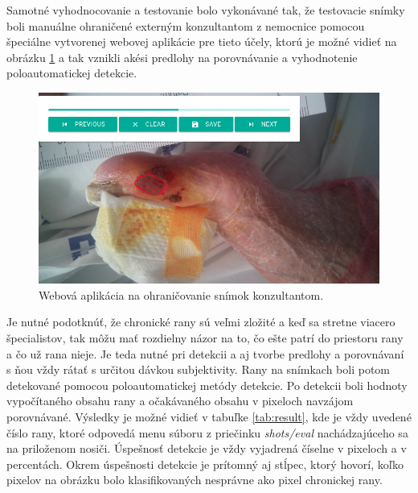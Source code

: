 Samotné vyhodnocovanie a testovanie bolo vykonávané tak, že testovacie snímky boli manuálne ohraničené externým konzultantom z nemocnice pomocou špeciálne vytvorenej webovej aplikácie pre tieto účely, ktorú je možné vidieť na obrázku \ref{fig:anotator} a tak vznikli akési predlohy na porovnávanie a vyhodnotenie poloautomatickej detekcie. 
\begin{figure}[h]
  \centering
  \includegraphics[scale=0.5]{fig/anotator.png}
  \caption{Webová aplikácia na ohraničovanie snímok konzultantom.}
  \label{fig:anotator}
\end{figure}
Je nutné podotknúť, že chronické rany sú veľmi zložité a keď sa stretne viacero špecialistov, tak môžu mať rozdielny názor na to, čo ešte patrí do priestoru rany a čo už rana nieje. Je teda nutné pri detekcii a aj tvorbe predlohy a porovnávaní s ňou vždy rátať s určitou dávkou subjektivity. Rany na snímkach boli potom detekované pomocou poloautomatickej metódy detekcie. Po detekcii boli hodnoty vypočítaného obsahu rany a očakávaného obsahu v pixeloch navzájom porovnávané. Výsledky je možné vidieť v tabuľke \ref{tab:result}, kde je vždy uvedené číslo rany, ktoré odpovedá menu súboru z priečinku \textit{shots/eval} nachádzajúceho sa na priloženom nosiči. Úspešnosť detekcie je vždy vyjadrená číselne v pixeloch a v percentách. Okrem úspešnosti detekcie je prítomný aj stĺpec, ktorý hovorí, koľko pixelov na obrázku bolo klasifikovaných nesprávne ako pixel chronickej rany. 
